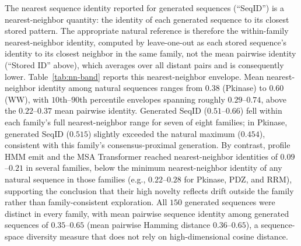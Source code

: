 The nearest sequence identity reported for generated sequences (``SeqID'') is a nearest-neighbor quantity: the identity of each generated sequence to its closest stored pattern. The appropriate natural reference is therefore the within-family nearest-neighbor identity, computed by leave-one-out as each stored sequence's identity to its closest neighbor in the same family, not the mean pairwise identity (``Stored ID'' above), which averages over all distant pairs and is consequently lower. Table~\ref{tab:nn-band} reports this nearest-neighbor envelope. Mean nearest-neighbor identity among natural sequences ranges from $0.38$ (Pkinase) to $0.60$ (WW), with $10$th--$90$th percentile envelopes spanning roughly $0.29$--$0.74$, above the $0.22$--$0.37$ mean pairwise identity. Generated SeqID ($0.51$--$0.66$) fell within each family's full nearest-neighbor range for seven of eight families; in Pkinase, generated SeqID ($0.515$) slightly exceeded the natural maximum ($0.454$), consistent with this family's consensus-proximal generation. By contrast, profile HMM emit and the MSA Transformer reached nearest-neighbor identities of $0.09$--$0.21$ in several families, below the minimum nearest-neighbor identity of any natural sequence in those families (e.g., $0.22$--$0.28$ for Pkinase, PDZ, and RRM), supporting the conclusion that their high novelty reflects drift outside the family rather than family-consistent exploration. All $150$ generated sequences were distinct in every family, with mean pairwise sequence identity among generated sequences of $0.35$--$0.65$ (mean pairwise Hamming distance $0.36$--$0.65$), a sequence-space diversity measure that does not rely on high-dimensional cosine distance.

